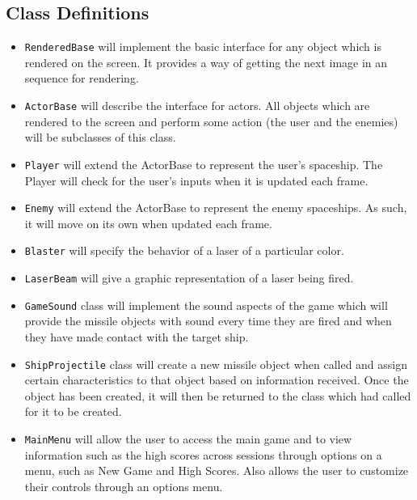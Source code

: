 \subsection*{Class Definitions}
    \begin{itemize}
        \item \texttt{RenderedBase} will implement the basic
        interface for any object which is rendered on the screen.
        It provides a way of getting the next image in an sequence
        for rendering.
        \item \texttt{ActorBase} will describe the interface
        for actors.  All objects which are rendered to the screen and
        perform some action (the user and the enemies) will be subclasses
        of this class.
        \item \texttt{Player} will extend the ActorBase to
        represent the user's spaceship. The Player will check for the user's
        inputs when it is updated each frame.
        \item \texttt{Enemy} will extend the ActorBase to represent
        the enemy spaceships. As such, it will move on its own when updated
        each frame.
        \item \texttt{Blaster} will specify the behavior of a
        laser of a particular color.
        \item \texttt{LaserBeam} will give a graphic representation
        of a laser being fired.
        \item \texttt{GameSound} class will implement
        the sound aspects of the game which will provide the
        missile objects with sound every time they are fired and
        when they have made contact with the target
        ship.
        \item \texttt{ShipProjectile} class will create
        a new missile object when called and assign certain
        characteristics to that object based on information
        received. Once the object has been created, it will then
        be returned to the class which had called for it to be created.
        \item \texttt{MainMenu} will allow the user to access
        the main game and to view information such as the high scores
        across sessions through options on a menu, such as New Game and
        High Scores. Also allows the user to customize their controls
        through an options menu.
    \end{itemize}

